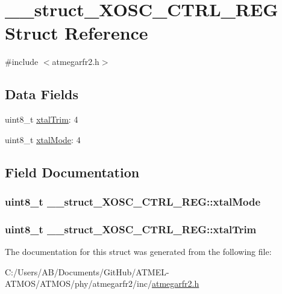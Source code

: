 \hypertarget{struct____struct___x_o_s_c___c_t_r_l___r_e_g}{\section{\-\_\-\-\_\-struct\-\_\-\-X\-O\-S\-C\-\_\-\-C\-T\-R\-L\-\_\-\-R\-E\-G Struct Reference}
\label{struct____struct___x_o_s_c___c_t_r_l___r_e_g}
}


{\ttfamily \#include $<$atmegarfr2.\-h$>$}

\subsection*{Data Fields}
\begin{DoxyCompactItemize}
\item 
uint8\-\_\-t \hyperlink{struct____struct___x_o_s_c___c_t_r_l___r_e_g_a08dc69b13d4bebeb9cdb35ad5bc27a03}{xtal\-Trim}\-: 4
\item 
uint8\-\_\-t \hyperlink{struct____struct___x_o_s_c___c_t_r_l___r_e_g_a42fc18db6315347baca653794a18ffee}{xtal\-Mode}\-: 4
\end{DoxyCompactItemize}


\subsection{Field Documentation}
\hypertarget{struct____struct___x_o_s_c___c_t_r_l___r_e_g_a42fc18db6315347baca653794a18ffee}{
\subsubsection[{xtal\-Mode}]{\setlength{\rightskip}{0pt plus 5cm}uint8\-\_\-t \-\_\-\-\_\-struct\-\_\-\-X\-O\-S\-C\-\_\-\-C\-T\-R\-L\-\_\-\-R\-E\-G\-::xtal\-Mode}}\label{struct____struct___x_o_s_c___c_t_r_l___r_e_g_a42fc18db6315347baca653794a18ffee}
\hypertarget{struct____struct___x_o_s_c___c_t_r_l___r_e_g_a08dc69b13d4bebeb9cdb35ad5bc27a03}{
\subsubsection[{xtal\-Trim}]{\setlength{\rightskip}{0pt plus 5cm}uint8\-\_\-t \-\_\-\-\_\-struct\-\_\-\-X\-O\-S\-C\-\_\-\-C\-T\-R\-L\-\_\-\-R\-E\-G\-::xtal\-Trim}}\label{struct____struct___x_o_s_c___c_t_r_l___r_e_g_a08dc69b13d4bebeb9cdb35ad5bc27a03}


The documentation for this struct was generated from the following file\-:\begin{DoxyCompactItemize}
\item 
C\-:/\-Users/\-A\-B/\-Documents/\-Git\-Hub/\-A\-T\-M\-E\-L-\/\-A\-T\-M\-O\-S/\-A\-T\-M\-O\-S/phy/atmegarfr2/inc/\hyperlink{atmegarfr2_8h}{atmegarfr2.\-h}\end{DoxyCompactItemize}
